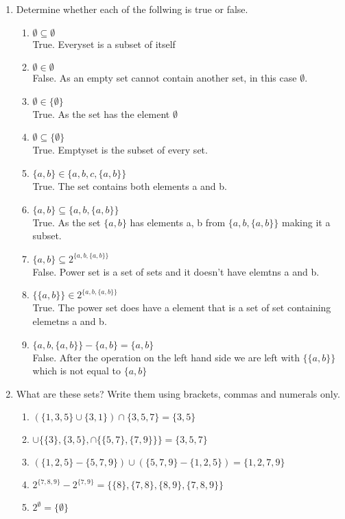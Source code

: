 \documentclass[a4paper,12pt]{article}
\begin{document}
\begin{enumerate}
\item
    Determine whether each of the follwing is true or false.
    \begin{enumerate}
        \item
            $\emptyset \subseteq \emptyset$ \\
            True. Everyset is a subset of itself
        \item
            $\emptyset \in \emptyset$ \\
            False. As an empty set cannot contain another set, in this case $\emptyset$.
        \item
            $\emptyset \in \{\emptyset\}$ \\
            True. As the set has the element $\emptyset$
        \item
            $\emptyset \subseteq \{\emptyset\}$ \\
            True. Emptyset is the subset of every set.
        \item
            $\{a, b\} \in \{a, b, c, \{a, b\}\}$ \\
            True. The set contains both elements a and b.
        \item
            $\{a, b\} \subseteq \{a, b, \{a, b\}\}$ \\
            True. As the set $\{a, b\}$ has elements a, b from $\{a, b, \{a, b\}\}$ making it a subset.
        \item
            $\{a, b\} \subseteq 2^{\{a, b, \{a, b\}\}}$ \\ 
            False. Power set is a set of sets and it doesn't have elemtns a and b.
        \item 
            $\{\{a, b \}\} \in 2^{\{a, b, \{a, b \}\}}$ \\
            True. The power set does have a element that is a set of set containing elemetns a and b.
        \item
            $\{a, b, \{a, b \}\} - \{a, b\} = \{a, b\}$ \\
            False. After the operation on the left hand side we are left with $\{\{a, b\}\}$ which is not equal to $\{a, b\}$
    \end{enumerate}
\item
    What are these sets? Write them using brackets, commas and numerals only.
    \begin{enumerate}
        \item
            $(\{1, 3, 5\} \cup \{3, 1\}) \cap \{3, 5, 7 \} = \{3, 5\}$ 
        \item 
            $\cup \{\{3\}, \{3, 5\}, \cap \{\{5, 7\}, \{7, 9\}\}\} = \{3, 5, 7\}$
        \item
            $(\{1, 2, 5\} - \{5, 7, 9\}) \cup (\{5, 7, 9\} - \{1, 2, 5\}) = \{1, 2, 7, 9\}$
        \item
            $2^{\{7, 8, 9\}} - 2^{\{7, 9\}} = \{\{8\}, \{7, 8\}, \{8, 9\}, \{7, 8, 9\}\}$
        \item
            $2^{\emptyset} = \{\emptyset\}$
            

\end{enumerate}
\end{enumerate}
\end{document}
